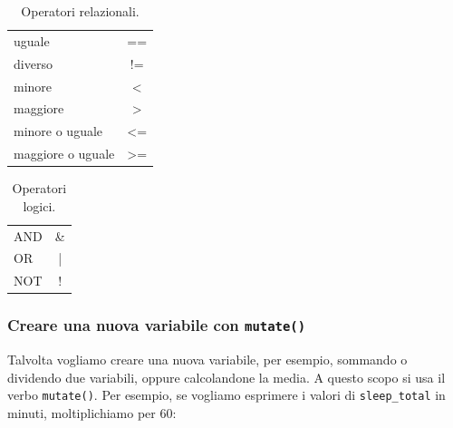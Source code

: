 \documentclass[
  10pt,
  italian,
  a4paper,
  extrafontsizes,onecolumn,openright
  ]{memoir}
\begin{document}
\begin{table}[h!]
  \begin{center}
    \caption{Operatori relazionali.}
    \label{tab:oprelazionali}
    \begin{tabular}{l c} 
      \toprule
      uguale             &  == \\
      diverso            &  !=  \\
      minore             &  <  \\
      maggiore           &  >  \\
      minore o uguale      & <=  \\
      maggiore o uguale  & >=  \\
      \bottomrule
    \end{tabular}
  \end{center}
\end{table}

\begin{table}[h!]
  \begin{center}
    \caption{Operatori logici.}
    \label{tab:oplogici}
    \begin{tabular}{l c} 
      \toprule
      AND      &  \&    \\
      OR       &  | \\
      NOT      &  !   \\
      \bottomrule
    \end{tabular}
  \end{center}
\end{table}

\hypertarget{creare-una-nuova-variabile-con-mutate}{%
\subsubsection{\texorpdfstring{Creare una nuova variabile con \texttt{mutate()}}{Creare una nuova variabile con mutate()}}\label{creare-una-nuova-variabile-con-mutate}}

Talvolta vogliamo creare una nuova variabile, per esempio, sommando o dividendo due variabili, oppure calcolandone la media. A questo scopo si usa il verbo \texttt{mutate()}. Per esempio, se vogliamo esprimere i valori di \texttt{sleep\_total} in minuti, moltiplichiamo per 60:
\end{document}

